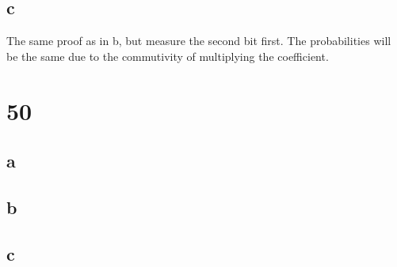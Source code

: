 \documentclass[letterpaper,notitlepage,twoside]{article}
\begin{document}
\subsection*{c}
The same proof as in b, but measure the second bit first. The probabilities will be the same due to the commutivity of multiplying the coefficient.\\
\section*{50}
\subsection*{a}

\subsection*{b}

\subsection*{c}
\end{document}

